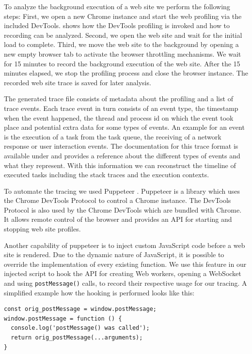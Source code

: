\documentclass[
	ruledheaders=section,%
	class=report,%
	thesis={type=bachelor},%
	accentcolor=9c,%
	custommargins=true,%
	marginpar=false,%
	parskip=half-,%
	fontsize=11pt,%
]{tudapub}
\begin{document}
  To analyze the background execution of a web site we perform the following steps: First, we open a new Chrome instance and start the web profiling via the included DevTools. \cite{chrome-devtools-performance-reference} shows how the DevTools profiling is invoked and how to recording can be analyzed. Second, we open the web site and wait for the initial load to complete. Third, we move the web site to the background by opening a new empty browser tab to activate the browser throttling mechanisms. We wait for 15 minutes to record the background execution of the web site. After the 15 minutes elapsed, we stop the profiling process and close the browser instance. The recorded web site trace is saved for later analysis.
  
  The generated trace file consists of metadata about the profiling and a list of trace events. Each trace event in turn consists of an event type, the timestamp when the event happened, the thread and process id on which the event took place and potential extra data for some types of events. An example for an event is the execution of a task from the task queue, the receiving of a network response or user interaction events. The documentation for this trace format is available under \cite{trace-event-format} and \cite{timeline-event-reference} provides a reference about the different types of events and what they represent. With this information we can reconstruct the timeline of executed tasks including the stack traces and the execution contexts.
    
  To automate the tracing we used Puppeteer \cite{pptr}. Puppeteer is a library which uses the Chrome DevTools Protocol \cite{chrome-devtools-protocol} to control a Chrome instance. The DevTools Protocol is also used by the Chrome DevTools which are bundled with Chrome. It allows remote control of the browser and provides an API for starting and stopping web site profiles.

  Another capability of puppeteer is to inject custom JavaScript code before a web site is rendered. Due to the dynamic nature of JavaScript, it is possible to override the implementation of every existing function. We use this feature in our injected script to hook the API for creating Web workers, opening a WebSocket and using \texttt{postMessage()} calls, to record their respective usage for our tracing. A simplified example how the hooking is performed looks like this:

\begin{lstlisting}
const orig_postMessage = window.postMessage;
window.postMessage = function () {
  console.log('postMessage() was called');
  return orig_postMessage(...arguments);
}
\end{lstlisting}
\end{document}
